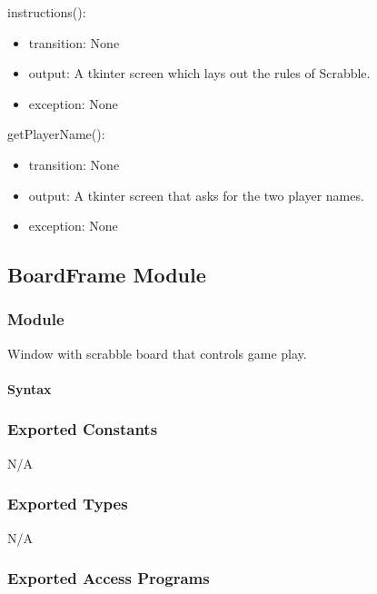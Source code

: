 \documentclass[12pt]{article}
\begin{document}
\noindent instructions():
\begin{itemize}
\item transition: None
\item output: A tkinter screen which lays out the rules of Scrabble.
\item exception: None
\end{itemize}

\noindent getPlayerName():
\begin{itemize}
\item transition: None
\item output: A tkinter screen that asks for the two player names.
\item exception: None
\end{itemize}

\subsection*{BoardFrame Module}

\subsubsection*{Module}

Window with scrabble board that controls game play.

\paragraph*{Syntax}

\subsubsection*{Exported Constants}
N/A
\subsubsection*{Exported Types}

N/A

\subsubsection* {Exported Access Programs}
\end{document}
